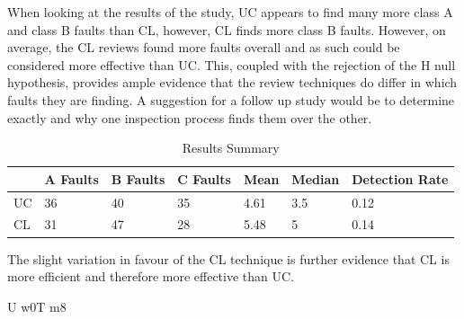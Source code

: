 \documentclass[10pt,twocolumn]{article}
\begin{document}
When looking at the results of the study, UC appears to find many more class A and class B faults than CL, however, CL finds more class B faults. However, on average, the CL reviews found more faults overall and as such could be considered more effective than UC. This, coupled with the rejection of the H null hypothesis, provides ample evidence that the review techniques do differ in which faults they are finding. A suggestion for a follow up study would be to determine exactly  and why one inspection process finds them over the other.

\begin{table}
	\centering
	\begin{tabular}[Ht]{| l | l | l | l | l | l | l |}
	\hline
	 & A Faults & B Faults & C Faults & Mean & Median & Detection Rate\\
	\hline
	UC & 36 & 40 & 35 & 4.61 & 3.5 & 0.12 \\
	\hline
	CL & 31 & 47 & 28 & 5.48 & 5 & 0.14 \\
	\hline
	\end{tabular}
	\caption{Results Summary}
\end{table}




The slight variation in favour of the CL technique is further evidence that CL is more efficient and therefore more effective than UC.








U w0T m8
\end{document}
